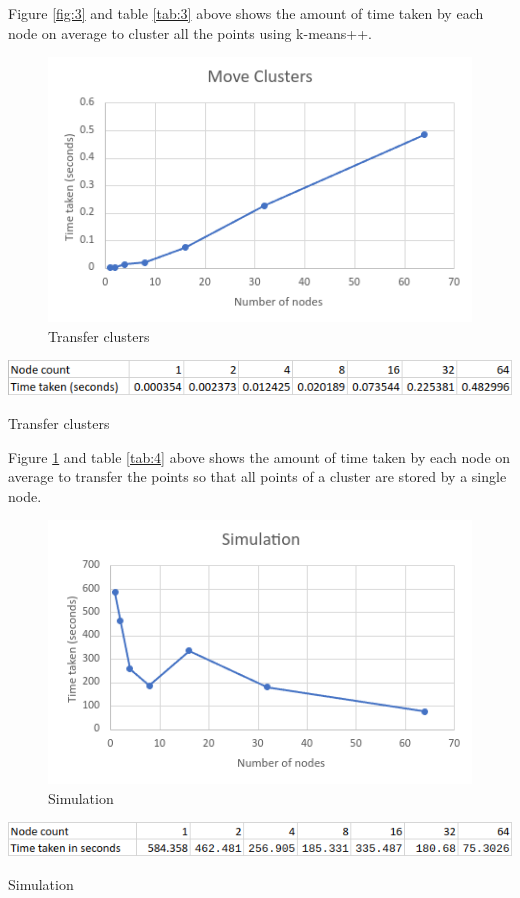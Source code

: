 \documentclass{article}
\begin{document}
Figure \ref{fig:3} and table \ref{tab:3} above shows the amount of time taken by each node on
average to cluster all the points using k-means++.

\clearpage
\begin{figure}[!htb]
\includegraphics[width=\textwidth]{move-clusters.png}
\caption{Transfer clusters}
\label{fig:4}
\end{figure}
\begin{table}[!htb]
\includegraphics[width=\textwidth]{move-clusters-table.png}
\caption{Transfer clusters}
\label{tab:4}
\end{table}

Figure \ref{fig:4} and table \ref{tab:4} above shows the amount of time taken by each node on
average to transfer the points so that all points of a cluster are stored by a single node.

\clearpage
\begin{figure}[!htb]
\includegraphics[width=\textwidth]{simulation-time.png}
\caption{Simulation}
\label{fig:5}
\end{figure}
\begin{table}[!htb]
\includegraphics[width=\textwidth]{simulation-time-table.png}
\caption{Simulation}
\label{tab:5}
\end{table}
\end{document}
